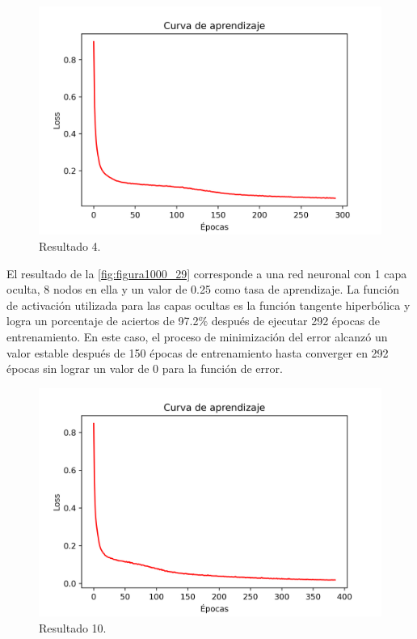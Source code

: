 \begin{figure}[h]
	\centering
	\includegraphics[scale=0.71]{imgss179.png}
	\caption{Resultado 4.}
	\label{fig:figura1000_29}
\end{figure} 

El resultado de la \autoref{fig:figura1000_29} corresponde a una red neuronal con 1 capa oculta, 8 nodos en ella y un valor de 0.25 como tasa de aprendizaje. La función de activación utilizada para las capas ocultas es la 
función tangente hiperbólica y logra un porcentaje de aciertos de 97.2$\%$ después de ejecutar 292 épocas de entrenamiento. En este caso, el proceso de minimización del error alcanzó un valor estable después de 150 épocas 
de entrenamiento hasta converger en 292 épocas sin lograr un valor de 0 para la función de error.

\begin{figure}[h]
	\centering
	\includegraphics[scale=0.71]{imgss185.png}
	\caption{Resultado 10.}
	\label{fig:figura1000_35}
\end{figure}

